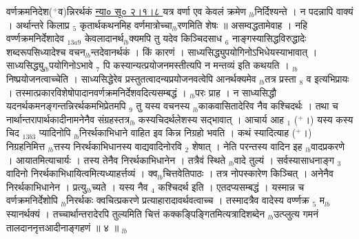 \documentclass[article,12pt,a4paper]{memoir}%
\newcommand{\add}[1]{($^{+}$#1)}
\newcounter{parCount}
\begin{document}
	  
	  \pstart \leavevmode%
	\hphantom{.}वर्णक्रमनिदेश\add{व}न्निरर्थकं \href{http://sarit.indology.info/?cref=ns\%C5\%AB.2.1.8}{न्या० सू० २।१।८ } यत्र वर्णा एव केवलं क्रमेण {\tiny $_{lb}$}निर्दिश्यन्ते । न पदन्नापि वाक्यं । अर्थान्तरे किलाप्र {\tiny $_{5}$} कृतार्थकथनमिह वर्णमात्रोच्चा{\tiny $_{lb}$}रणमिति शेषः ॥ असम्वद्धतामेवाह । {\color{DodgerBlue3}नहि वर्ण्णक्रमनिर्देशादेव} {\tiny $_{13a9}$} केवलादानर्थ{\tiny $_{lb}$}क्यमपि तु यदेव किञ्चिदसाध {\tiny $_{6}$} नाङ्गस्यासिद्धविरुद्धादेः शब्दरूपसिध्यादेश्च वचन{\tiny $_{lb}$}न्तदेवानर्थकं । किं कारणं । साध्यसिद्ध्युपयोगिनोऽभिधेयस्याभावात् । साध्यसिद्ध्यु{\tiny $_{lb}$}पयोगिनोऽभावे {\tiny $_{7}$} पि कस्यान्यत्प्रयोजनमस्तीत्यपि न मन्तव्यं इति कथयति । {\tiny $_{lb}$}निष्प्रयोजनत्वाच्चेति । साध्यसिद्धेरेव प्रस्तुतत्वादन्यप्रयोजनवत्वेपि आनर्थक्यमेव {\tiny $_{lb}$}तत्र प्रस्ता {\tiny $_{8}$} व इत्यभिप्रायः । तस्मात्प्रकारविशेषोपादानवर्णक्रमनिर्देशवदित्यसम्बद्धं । {\tiny $_{lb}$}परः प्राह । न साध्यसिद्धौ यदनर्थकमनङ्गन्तन्निरर्थकमभिप्रेतमपि {\tiny $_{9}$} \leavevmode{} तु यस्य वचनस्य {\tiny $_{lb}$}काकवासितादेरिव नैव कश्चिदर्थः । तथा च नार्थान्तरापार्थकादीनामनेनैव संग्रहस्तत्र{\tiny $_{lb}$}\leavevmode{} कस्यचिदर्थलेशस्य सद्भावात् । {\color{DodgerBlue3}आचार्य} आह {\tiny $_{1}$} \add{।} {\color{DodgerBlue3}यस्य कस्य चिद} {\tiny $_{13b3}$} प्यादिनोपि {\tiny $_{lb}$}निरर्थकाभिधाने वाहित इव किन्न निग्रहो भवति । कथं स्यादित्याह \add{।} {\color{DodgerBlue3}निग्रहनिमित्त {\tiny $_{lb}$}त्तस्य} निरर्थकाभिधानस्य वाद्यवादिनोरवि {\tiny $_{2}$} शेषात् । नेति परन्तस्य वादिन इह {\tiny $_{lb}$}वादप्रकरणे । आयातमित्याचार्यः । तस्य तेनैव निरर्थकाभिधानेन । तत्रैवं स्थिते {\tiny $_{lb}$}वादे तुल्यं । सर्वस्यासाधनाङ्ग {\tiny $_{3}$} वादिनो निरर्थकाभिधायित्वमित्यध्याहर्त्तव्यं । क्व{\tiny $_{lb}$}चित्तवेतिपाठः । तत्र नोपस्कारेण किञ्चित् । अनेनैव निरर्थकाभिधानेन । प्रत्यु{\tiny $_{lb}$}च्यते । यस्य नैव {\tiny $_{4}$} कश्चिदर्थ इति । एतदप्यसम्बद्धं । यस्मान्न च वर्णक्रमनिर्देशोपि {\tiny $_{lb}$}निरर्थकः क्वचित्प्रकरणे प्रत्याहारादावर्थवत्वाच्च । तस्मादत्रैव वादेस्य वर्ण्णक्र {\tiny $_{5}$} म{\tiny $_{lb}$}स्यानर्थक्यं । तच्चार्थान्तरादेरपि तुल्यमिति चित्तं कक्कङ्पिङ्गितमित्यत्रादिशब्देन {\tiny $_{lb}$}उत्प्लुत्य गमनं तालदाननृत्तआदीनाङ्गहणं ॥ ४ ॥
	{}
	\pend%
      {\tiny $_{lb}$}
\end{document}
